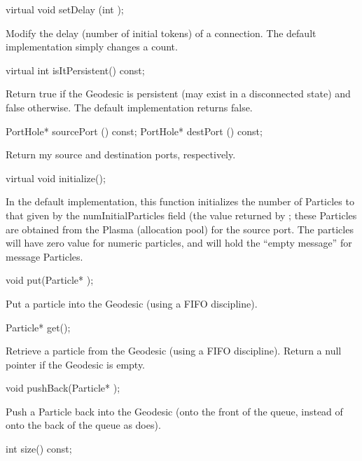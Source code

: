 \begin{example}
virtual void setDelay (int );
\end{example}

Modify the delay (number of initial tokens) of a connection.  The
default implementation simply changes a count.

\begin{example}
virtual int isItPersistent() const;
\end{example}

Return true if the Geodesic is persistent (may exist in a disconnected
state) and false otherwise.  The default implementation returns false.

\begin{example}
PortHole* sourcePort () const;
PortHole* destPort () const;
\end{example}

Return my source and destination ports, respectively.

\begin{example}
virtual void initialize();
\end{example}

In the default implementation, this function initializes the number of
Particles to that given by the numInitialParticles field (the value
returned by ; these Particles are obtained from the
Plasma (allocation pool) for the source port.  The particles will
have zero value for numeric particles, and will hold the ``empty message''
for message Particles.

\begin{example}
void put(Particle* );
\end{example}

Put a particle into the Geodesic (using a FIFO discipline).

\begin{example}
Particle* get();
\end{example}

Retrieve a particle from the Geodesic (using a FIFO discipline).
Return a null pointer if the Geodesic is empty.

\begin{example}
void pushBack(Particle* );
\end{example}

Push a Particle back into the Geodesic (onto the front of the queue,
instead of onto the back of the queue as  does).

\begin{example}
int size() const;
\end{example}

